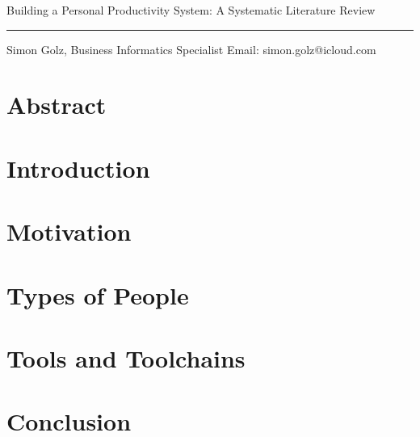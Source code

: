 \documentclass[12pt]{article}
\author{Simon Golz}
\begin{document}
  {\LARGE\noindent Building a Personal Productivity System: A Systematic Literature Review}
  \vspace{5mm}
  \hrule{}
  \vspace{2mm}

  {\footnotesize\noindent Simon Golz, Business Informatics Specialist \hfill{} Email: simon.golz@icloud.com}

  \section*{Abstract}
  \blindtext{}

  \vspace{10mm}

  \begin{multicols*}{2}
    \section{Introduction}
    \blindtext{}\blindtext{}\blindtext{}
    \section{Motivation}
    \blindtext{}\cite{Clear}\blindtext{}
    \section{Types of People}
    \blindtext{}\blindtext{}
    \section{Tools and Toolchains}
    \blindtext{}\blindtext{}
    \section*{Conclusion}
    \blindtext{}\blindtext{}
    \printbibliography{}
  \end{multicols*}
\end{document}
